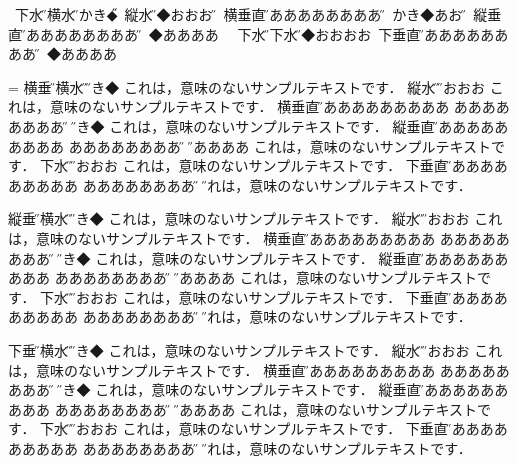 \vfill\eject

\leavevmode
\hbox{\dtou
下水平\H\vrule\hbox{\yoko 横水平\H }\vrule かき◆\H\vrule
\hbox{\tate 縦水平\H }\vrule ◆おおおお\H\vrule
\vbox{\yoko\hsize=30mm 横垂直\H ああああああああああ\hfill\H}%
\vrule かき◆あおう\H\vrule
\vbox{\tate\hsize=30mm 縦垂直\H ああああああああああ\hfill\H}%
\vrule ◆ああああ
}
\hbox{\dtou
下水平\H\vrule\hbox{\dtou 下水平\H }\vrule◆おおおお\vrule
\vbox{\dtou\hsize=30mm 下垂直\H ああああああああああ\hfill\H}%
\vrule ◆ああああ}


\vfill\eject


=\vbox{\yoko\hsize=100mm
横垂直\H\vrule \hbox{\yoko 横水平\H }\vrule\H かき◆
これは，意味のないサンプルテキストです．
\vrule\hbox{\tate 縦水平\H }\vrule\H おおおお
これは，意味のないサンプルテキストです．\vrule
\vbox{\yoko\hsize=50mm 横垂直\H ああああああああああ%
  あああああああああ\hfill\H}%
\vrule\H かき◆
これは，意味のないサンプルテキストです．\vrule
\vbox{\tate\hsize=50mm 縦垂直\H ああああああああああ%
  あああああああああ\hfill\H}%
\vrule\H ◆ああああ
これは，意味のないサンプルテキストです．\vrule
\hbox{\dtou 下水平\H }\vrule\H おおおお
これは，意味のないサンプルテキストです．
\vrule\vbox{\dtou\hsize=50mm 下垂直\H ああああああああああ%
  あああああああああ\hfill\H}%
\vrule\H これは，意味のないサンプルテキストです．
}
\vfill\eject

\vbox{\tate\hsize=100mm
縦垂直\H\vrule\hbox{\yoko 横水平\H }\vrule\H かき◆
これは，意味のないサンプルテキストです．
\vrule\hbox{\tate 縦水平\H }\vrule\H おおおお
これは，意味のないサンプルテキストです．\vrule
\vbox{\yoko\hsize=50mm 横垂直\H ああああああああああ%
  あああああああああ\hfill\H}%
\vrule\H かき◆
これは，意味のないサンプルテキストです．\vrule
\vbox{\tate\hsize=50mm 縦垂直\H ああああああああああ%
  あああああああああ\hfill\H}%
\vrule\H ◆ああああ
これは，意味のないサンプルテキストです．\vrule
\hbox{\dtou 下水平\H }\vrule\H おおおお
これは，意味のないサンプルテキストです．
\vrule\vbox{\dtou\hsize=50mm 下垂直\H ああああああああああ%
  あああああああああ\hfill\H}%
\vrule\H これは，意味のないサンプルテキストです．
}
\vfill\eject

\vbox{\dtou\hsize=100mm
下垂直\H\vrule\hbox{\yoko 横水平\H }\vrule\H かき◆
これは，意味のないサンプルテキストです．
\vrule\hbox{\tate 縦水平\H }\vrule\H おおおお
これは，意味のないサンプルテキストです．\vrule
\vbox{\yoko\hsize=50mm 横垂直\H ああああああああああ%
  あああああああああ\hfill\H}%
\vrule\H かき◆
これは，意味のないサンプルテキストです．\vrule
\vbox{\tate\hsize=50mm 縦垂直\H ああああああああああ%
  あああああああああ\hfill\H}%
\vrule\H ◆ああああ
これは，意味のないサンプルテキストです．\vrule
\hbox{\dtou 下水平\H }\vrule\H おおおお
これは，意味のないサンプルテキストです．
\vrule\vbox{\dtou\hsize=50mm 下垂直\H ああああああああああ%
  あああああああああ\hfill\H}%
\vrule\H これは，意味のないサンプルテキストです．
}

